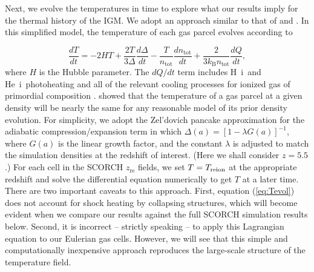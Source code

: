 \documentclass[twocolumn]{aastex62}
\newcommand{\zreion}{z_{\mathrm{re}}}
\newcommand{\HI}{H{\sc~i}}
\newcommand{\HeI}{He{\sc~i}}
\newcommand{\Treion}{T_{\rm reion}}
\begin{document}
Next, we evolve the temperatures in time to explore what our results imply for the thermal history of the IGM.  We adopt an approach similar to that of \citet{2017arXiv170808927D} and \citet{2016MNRAS.460.1885U}.   In this simplified model, the temperature of each gas parcel evolves according to 

\begin{equation}
\frac{dT}{dt} = -2 H T + \frac{2 T}{3 \Delta}\frac{d \Delta}{d t} - \frac{T}{n_{\mathrm{tot}}} \frac{d n_{\mathrm{tot}}}{dt} + \frac{2}{3 k_\mathrm{B} n_{\mathrm{tot}}} \frac{d Q}{dt},
\label{eq:Tevol}
\end{equation}
where $H$ is the Hubble parameter.  The $dQ/dt$ term includes \HI\ and \HeI\ photoheating and all of the relevant cooling processes for ionized gas of primordial composition \citep{1997MNRAS.292...27H}.  \citet{2016MNRAS.456...47M} showed that the temperature of a gas parcel at a given density will be nearly the same for any reasonable model of its prior density evolution.  For simplicity, we adopt the Zel'dovich pancake approximation for the adiabatic compression/expansion term in which $\Delta(a)=\left[ 1- \lambda G(a) \right]^{-1}$, where $G(a)$ is the linear growth factor, and the constant $\lambda$ is adjusted to match the simulation densities at the redshift of interest. (Here we shall consider $z=5.5$.) For each cell in the SCORCH $\zreion$ fields, we set $T=\Treion$ at the appropriate redshift and solve the differential equation numerically to get $T$ at a later time.  There are two important caveats to this approach. First, equation (\ref{eq:Tevol}) does not account for shock heating by collapsing structures, which will become evident when we compare our results against the full SCORCH simulation results below. Second, it is incorrect -- strictly speaking -- to apply this Lagrangian equation to our Eulerian gas cells.  However, we will see that this simple and computationally inexpensive approach reproduces the large-scale structure of the temperature field. 
\end{document}
